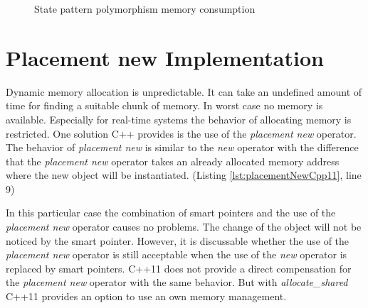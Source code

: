 {\begin{figure}[h]{}
\centering
\mbox{}
\caption{State pattern polymorphism memory consumption}
\label{fig:polymorphismImplementationMemoryConsumption}
\end{figure}

\FloatBarrier
 
\section{Placement new Implementation}\label{sec:placementNewImplementation}
\noindent Dynamic memory allocation is unpredictable. It can take an undefined amount of time for finding a suitable chunk of memory. In worst case no memory is available. Especially for real-time systems the behavior of allocating memory is restricted. One solution C++ provides is the use of the \emph{placement new} operator. The behavior of \emph{placement new} is similar to the \emph{new} operator with the difference that the \emph{placement new} operator takes an already allocated memory address where the new object will be instantiated. (Listing \ref{lst:placementNewCpp11}, line 9)



\FloatBarrier
\noindent In this particular case the combination of smart pointers and the use of the \emph{placement new} operator causes no problems. The change of the object will not be noticed by the smart pointer. However, it is discussable whether the use of the \emph{placement new} operator is still acceptable when the use of the \emph{new} operator is replaced by smart pointers. C++11 does not provide a direct compensation for the \emph{placement new} operator with the same behavior. But with \emph{allocate\_shared} C++11 provides an option to use an own memory management. 

}
